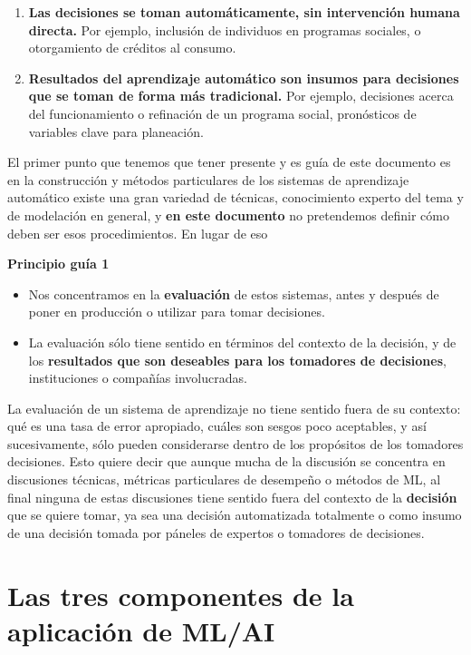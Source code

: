 \documentclass[
]{book}
\providecommand{\tightlist}{%
  \setlength{\itemsep}{0pt}\setlength{\parskip}{0pt}}
\let\BeginKnitrBlock\begin \let\EndKnitrBlock\end
\begin{document}
\begin{enumerate}
\def\labelenumi{\arabic{enumi}.}
\tightlist
\item
  \textbf{Las decisiones se toman automáticamente, sin intervención humana directa.}
  Por ejemplo, inclusión de individuos en programas sociales, o otorgamiento de créditos al consumo.
\item
  \textbf{Resultados del aprendizaje automático son insumos para decisiones que se toman de forma más tradicional.} Por ejemplo, decisiones acerca del funcionamiento o refinación de un programa social, pronósticos
  de variables clave para planeación.
\end{enumerate}

El primer punto que tenemos que tener presente y es guía de este documento es
en la construcción y métodos particulares de los sistemas de aprendizaje automático existe una gran variedad de técnicas, conocimiento experto del tema y de modelación en general, y \textbf{en este documento} no pretendemos definir cómo deben ser esos procedimientos. En lugar de eso

\BeginKnitrBlock{rmdpunto}
\textbf{Principio guía 1}

\begin{itemize}
\tightlist
\item
  Nos concentramos en la \textbf{evaluación} de estos sistemas, antes y después de poner
  en producción o utilizar para tomar decisiones.
\item
  La evaluación sólo tiene sentido en términos del contexto de la decisión, y de los
  \textbf{resultados que son deseables para los tomadores de decisiones}, instituciones o compañías involucradas.
\end{itemize}
\EndKnitrBlock{rmdpunto}

La evaluación de un sistema de aprendizaje no tiene sentido fuera de su contexto: qué es una tasa
de error apropiado, cuáles son sesgos poco aceptables, y así sucesivamente, sólo pueden considerarse
dentro de los propósitos de los tomadores decisiones. Esto quiere decir que
aunque mucha de la discusión se concentra en
discusiones técnicas, métricas particulares de desempeño o métodos de ML, al final
ninguna de estas discusiones tiene sentido fuera del contexto de la \textbf{decisión} que
se quiere tomar, ya sea una decisión automatizada totalmente o como insumo de una decisión
tomada por páneles de expertos o tomadores de decisiones.

\hypertarget{las-tres-componentes-de-la-aplicaciuxf3n-de-mlai}{%
\section{Las tres componentes de la aplicación de ML/AI}\label{las-tres-componentes-de-la-aplicaciuxf3n-de-mlai}}
\end{document}
